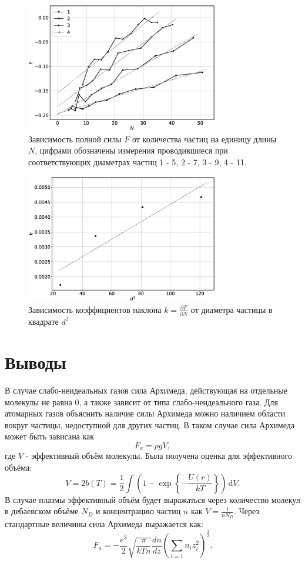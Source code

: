\documentclass[12pt]{article}
\begin{document}
\begin{figure}[H]
    \centering
    \includegraphics[width=0.75\textwidth]{FN.eps}
    \caption{Зависимость полной силы $F$ от количества частиц на единицу длины $N$, цифрами обозначены 
    измерения проводившиеся при соответствующих диаметрах частиц 1 - 5, 2 - 7, 3 - 9, 4 - 11.}
    \label{fig:FN}
\end{figure}

\begin{figure}[H]
    \centering
    \includegraphics[width=0.75\textwidth]{kr.eps}
    \caption{Зависимость коэффициентов наклона $k = \frac{\partial F}{\partial N}$ от диаметра частицы в 
    квадрате $d^2$}
    \label{fig:kr}
\end{figure}

\section{Выводы}
В случае слабо-неидеальных газов сила Архимеда, действующая на отдельные молекулы не равна 0, а также 
зависит от типа слабо-неидеального газа. Для атомарных газов объяснить наличие силы Архимеда можно 
наличием области вокруг частицы, недоступной для других частиц. В таком случае сила Архимеда может быть зависана 
как 
\[
    F_a = pgV, 
\]
где $V$ - эффективный объём молекулы. Была получена оценка для эффективного объёма: 
\[
    V = 2b(T) = \frac{1}{2} \int \left( 1 - \exp \left\{ -\frac{U(r)}{kT} \right\}  \right)  \,\mathrm{d}V.
\] 
В случае плазмы эффективный объём будет выражаться через количество молекул в дебаевском объёме $N_D$ и 
концентрацию частиц $n$ как $V = \frac{1}{n N_D}$. Через стандартные величины сила Архимеда выражается как: 
\[
    F_a = -\frac{e^3}{2} \sqrt{\frac{\pi}{kTn}} \frac{dn}{dz} \left( \sum_{i=1} n_i z_i^2 \right)^\frac{3}{2}.
\]
\end{document}
